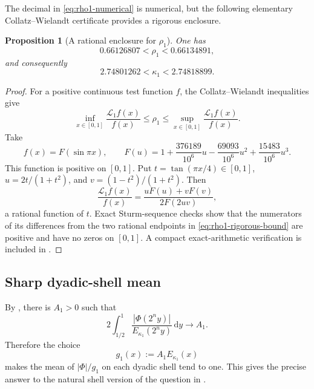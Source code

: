 \documentclass[11pt,oneside]{article}
\newtheorem{proposition}[theorem]{Proposition}
\theoremstyle{definition}
\theoremstyle{remark}
\newcommand{\dd}{\,\mathrm d}
\newcommand{\Phiup}{\Phi}
\newcommand{\abs}[1]{\left|#1\right|}
\begin{document}
The decimal in \eqref{eq:rho1-numerical} is numerical, but the following elementary
Collatz--Wielandt certificate provides a rigorous enclosure.

\begin{proposition}[A rational enclosure for $\rho_1$]
\label{prop:rho1-rigorous-bound}
One has
\begin{equation}
 0.66126807<\rho_1<0.66134891,
 \label{eq:rho1-rigorous-bound}
\end{equation}
and consequently
\begin{equation}
 2.74801262<\kappa_1<2.74818899.
 \label{eq:kappa1-rigorous-bound}
\end{equation}
\end{proposition}

\begin{proof}
For a positive continuous test function $f$, the Collatz--Wielandt inequalities give
\[
 \inf_{x\in[0,1]}\frac{\mathcal L_1f(x)}{f(x)}
 \le\rho_1\le
 \sup_{x\in[0,1]}\frac{\mathcal L_1f(x)}{f(x)}.
\]
Take
\[
 f(x)=F(\sin\pi x),\qquad
 F(u)=1+\frac{376189}{10^6}u-\frac{69093}{10^6}u^2
       +\frac{15483}{10^6}u^3.
\]
This function is positive on $[0,1]$.  Put $t=\tan(\pi x/4)\in[0,1]$,
$u=2t/(1+t^2)$, and $v=(1-t^2)/(1+t^2)$.  Then
\[
 \frac{\mathcal L_1f(x)}{f(x)}
 =\frac{uF(u)+vF(v)}{2F(2uv)},
\]
a rational function of $t$.  Exact Sturm-sequence checks show that the numerators of its
differences from the two rational endpoints in \eqref{eq:rho1-rigorous-bound} are positive
and have no zeros on $[0,1]$.  A compact exact-arithmetic verification is included in
.
\end{proof}

\subsection{Sharp dyadic-shell mean}

By , there is $A_1>0$ such that
\begin{equation}
 2\int_{1/2}^{1}
 \frac{\abs{\Phiup(2^ny)}}{E_{\kappa_1}(2^ny)}\dd y
 \longrightarrow A_1.
 \label{eq:L1-shell-mean}
\end{equation}
Therefore the choice
\begin{equation}
 g_1(x):=A_1E_{\kappa_1}(x)
 \label{eq:g1}
\end{equation}
makes the mean of $\abs{\Phiup}/g_1$ on each dyadic shell tend to one.  This gives the
precise answer to the natural shell version of the question in \cite{mse-decay}.
\end{document}
